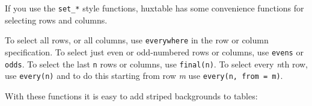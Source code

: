 \documentclass[]{article}
\newenvironment{Shaded}{\begin{snugshade}}{\end{snugshade}}
\newcommand{\KeywordTok}[1]{\textcolor[rgb]{0.13,0.29,0.53}{\textbf{#1}}}
\newcommand{\DecValTok}[1]{\textcolor[rgb]{0.00,0.00,0.81}{#1}}
\newcommand{\StringTok}[1]{\textcolor[rgb]{0.31,0.60,0.02}{#1}}
\newcommand{\OtherTok}[1]{\textcolor[rgb]{0.56,0.35,0.01}{#1}}
\newcommand{\OperatorTok}[1]{\textcolor[rgb]{0.81,0.36,0.00}{\textbf{#1}}}
\newcommand{\NormalTok}[1]{#1}
\begin{document}
If you use the \texttt{set\_*} style functions, huxtable has some
convenience functions for selecting rows and columns.

To select all rows, or all columns, use \texttt{everywhere} in the row
or column specification. To select just even or odd-numbered rows or
columns, use \texttt{evens} or \texttt{odds}. To select the last
\texttt{n} rows or columns, use \texttt{final(n)}. To select every
\emph{n}th row, use \texttt{every(n)} and to do this starting from row
\emph{m} use \texttt{every(n,\ from\ =\ m)}.

With these functions it is easy to add striped backgrounds to tables:

\begin{Shaded}
\end{Shaded}
\end{document}
